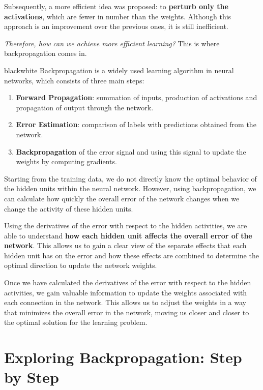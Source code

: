Subsequently, a more efficient idea was proposed: to \textbf{perturb only the activations}, which are fewer in number than the weights. Although this approach is an improvement over the previous ones, it is still inefficient.

\textit{Therefore, how can we achieve more efficient learning?} This is where backpropagation comes in.

\begin{remark}{black}{white}
Backpropagation is a widely used learning algorithm in neural networks, which consists of three main steps:

\begin{enumerate}
    \item \textbf{Forward Propagation}: summation of inputs, production of activations and propagation of output through the network.

    \item \textbf{Error Estimation}: comparison of labels with predictions obtained from the network.

    \item \textbf{Backpropagation} of the error signal and using this signal to update the weights by computing gradients.
\end{enumerate}
\end{remark}

Starting from the training data, we do not directly know the optimal behavior of the hidden units within the neural network. However, using backpropagation, we can calculate how quickly the overall error of the network changes when we change the activity of these hidden units.

Using the derivatives of the error with respect to the hidden activities, we are able to understand \textbf{how each hidden unit affects the overall error of the network}. This allows us to gain a clear view of the separate effects that each hidden unit has on the error and how these effects are combined to determine the optimal direction to update the network weights.

Once we have calculated the derivatives of the error with respect to the hidden activities, we gain valuable information to update the weights associated with each connection in the network. This allows us to adjust the weights in a way that minimizes the overall error in the network, moving us closer and closer to the optimal solution for the learning problem.

\section{Exploring Backpropagation: Step by Step}

